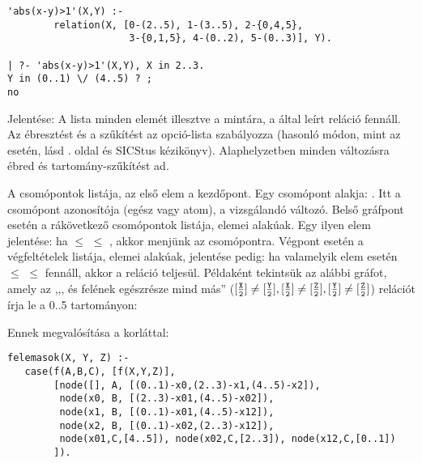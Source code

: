 \begin{verbatim}
'abs(x-y)>1'(X,Y) :-
        relation(X, [0-(2..5), 1-(3..5), 2-{0,4,5},
                     3-{0,1,5}, 4-(0..2), 5-(0..3)], Y).

| ?- 'abs(x-y)>1'(X,Y), X in 2..3.
Y in (0..1) \/ (4..5) ? ;
no
\end{verbatim}

\medskip
{}

Jelentése: A  lista minden elemét illesztve a 
mintára, a  által leírt reláció fennáll. Az ébresztést és a
szűkítést az  opció-lista szabályozza (hasonló módon, mint
az  esetén, lásd \pageref{all_distinct}. oldal és 
SICStus kézikönyv). Alaphelyzetben minden változásra ébred és
tartomány-szűkítést ad.

A  csomópontok listája, az első elem a kezdőpont. Egy csomópont
alakja: . Itt  a csomópont azonosítója
(egész vagy atom),  a vizsgálandó változó. Belső gráfpont esetén
 a rákövetkező csomópontok listája, elemei 
alakúak. Egy ilyen elem jelentése: ha  $\leq$  $\leq$ ,
akkor menjünk az  csomópontra. Végpont esetén  a
végfeltételek listája, elemei  alakúak, jelentése pedig: ha
valamelyik elem esetén  $\leq$  $\leq$  fennáll, akkor
a reláció teljesül.
\br
Példaként tekintsük az alábbi gráfot, amely az ,,,  és 
felének egészrésze mind más'' (\([\frac{\texttt{X}}{\texttt{2}}]\neq[\frac{\texttt{Y}}{\texttt{2}}],
[\frac{\texttt{X}}{\texttt{2}}]\neq[\frac{\texttt{Z}}{\texttt{2}}],
[\frac{\texttt{Y}}{\texttt{2}}]\neq[\frac{\texttt{Z}}{\texttt{2}}]\)) relációt írja le a 0..5
tartományon:

\begin{center}\end{center}

Ennek megvalósítása a  korláttal:

\begin{verbatim}
felemasok(X, Y, Z) :-
   case(f(A,B,C), [f(X,Y,Z)],
        [node([], A, [(0..1)-x0,(2..3)-x1,(4..5)-x2]),
         node(x0, B, [(2..3)-x01,(4..5)-x02]),
         node(x1, B, [(0..1)-x01,(4..5)-x12]),
         node(x2, B, [(0..1)-x02,(2..3)-x12]),
         node(x01,C,[4..5]), node(x02,C,[2..3]), node(x12,C,[0..1])
        ]).
\end{verbatim}

